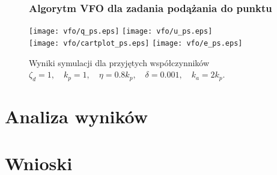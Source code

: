 \documentclass[12pt, a4paper, polish]{article}
\begin{document}
\begin{figure}[H]
	\subsubsection{Algorytm VFO dla zadania podążania do punktu}
	\texttt{[image: vfo/q\_ps.eps]}
	\texttt{[image: vfo/u\_ps.eps]}\\
	\texttt{[image: vfo/cartplot\_ps.eps]}	
	\texttt{[image: vfo/e\_ps.eps]}
	\caption{Wyniki symulacji dla przyjętych współczynników $\zeta_d=1,\quad k_p =1, \quad \eta=0.8k_p,\quad \delta=0.001,\quad k_a=2k_p$.}\end{figure}


\newpage\section{Analiza wyników}
\section{Wnioski}
\end{document}
